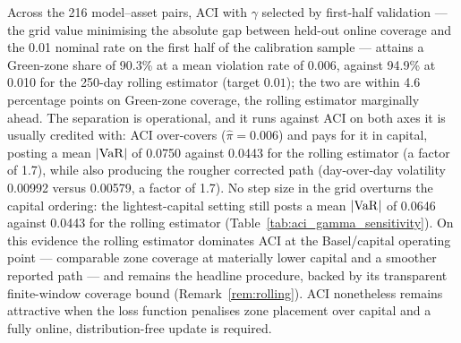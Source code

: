 Across the 216 model--asset pairs, ACI with $\gamma$ selected by first-half validation --- the grid value minimising the absolute gap between held-out online coverage and the 0.01 nominal rate on the first half of the calibration sample --- attains a Green-zone share of 90.3\% at a mean violation rate of 0.006, against 94.9\% at 0.010 for the 250-day rolling estimator (target $0.01$); the two are within 4.6 percentage points on Green-zone coverage, the rolling estimator marginally ahead. The separation is operational, and it runs against ACI on both axes it is usually credited with: ACI over-covers ($\hat\pi = 0.006$) and pays for it in capital, posting a mean $|\mathrm{VaR}|$ of 0.0750 against 0.0443 for the rolling estimator (a factor of 1.7), while also producing the rougher corrected path (day-over-day volatility 0.00992 versus 0.00579, a factor of 1.7). No step size in the grid overturns the capital ordering: the lightest-capital setting still posts a mean $|\mathrm{VaR}|$ of 0.0646 against 0.0443 for the rolling estimator (Table~\ref{tab:aci_gamma_sensitivity}). On this evidence the rolling estimator dominates ACI at the Basel/capital operating point --- comparable zone coverage at materially lower capital and a smoother reported path --- and remains the headline procedure, backed by its transparent finite-window coverage bound (Remark~\ref{rem:rolling}). ACI nonetheless remains attractive when the loss function penalises zone placement over capital and a fully online, distribution-free update is required.
